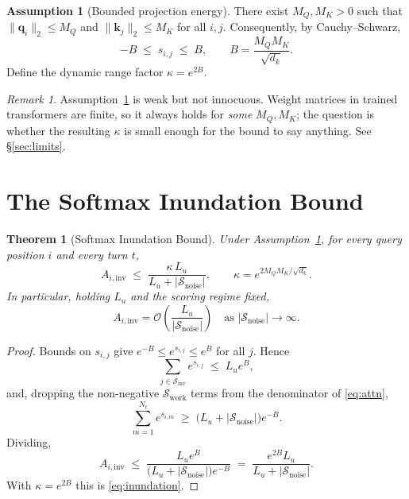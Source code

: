 ﻿\documentclass[11pt,a4paper]{article}
\theoremstyle{plain}
\newtheorem{theorem}{Theorem}
\theoremstyle{definition}
\newtheorem{assumption}{Assumption}
\theoremstyle{remark}
\newtheorem{remark}{Remark}
\begin{document}
\begin{assumption}[Bounded projection energy]
\label{assump:bounded}
There exist $M_Q, M_K > 0$ such that $\|\mathbf{q}_i\|_2 \le M_Q$ and
$\|\mathbf{k}_j\|_2 \le M_K$ for all $i,j$. Consequently, by Cauchy--Schwarz,
\begin{equation}
  -B \;\le\; s_{i,j} \;\le\; B,
  \qquad B = \frac{M_Q M_K}{\sqrt{d_k}} .
\end{equation}
Define the dynamic range factor $\kappa = e^{2B}$.
\end{assumption}

\begin{remark}
Assumption~\ref{assump:bounded} is weak but not innocuous. Weight matrices in
trained transformers are finite, so it always holds for \emph{some} $M_Q, M_K$;
the question is whether the resulting $\kappa$ is small enough for the bound to
say anything. See \S\ref{sec:limits}.
\end{remark}

\section{The Softmax Inundation Bound}
\label{sec:inundation}

\begin{theorem}[Softmax Inundation Bound]
\label{thm:inundation}
Under Assumption~\ref{assump:bounded}, for every query position $i$ and every
turn $t$,
\begin{equation}
  A_{i,\mathrm{inv}}
  \;\le\;
  \frac{\kappa\, L_u}{L_u + |\mathcal{S}_{\mathrm{noise}}|},
  \qquad \kappa = e^{2M_QM_K/\sqrt{d_k}} .
  \label{eq:inundation}
\end{equation}
In particular, holding $L_u$ and the scoring regime fixed,
\begin{equation}
  A_{i,\mathrm{inv}} = \mathcal{O}\!\left(\frac{L_u}{|\mathcal{S}_{\mathrm{noise}}|}\right)
  \quad \text{as } |\mathcal{S}_{\mathrm{noise}}| \to \infty .
\end{equation}
\end{theorem}

\begin{proof}
Bounds on $s_{i,j}$ give $e^{-B} \le e^{s_{i,j}} \le e^{B}$ for all $j$. Hence
\begin{equation}
  \sum_{j \in \mathcal{S}_{\mathrm{inv}}} e^{s_{i,j}} \;\le\; L_u e^{B},
\end{equation}
and, dropping the non-negative $\mathcal{S}_{\mathrm{work}}$ terms from the
denominator of \eqref{eq:attn},
\begin{equation}
  \sum_{m=1}^{N_t} e^{s_{i,m}}
  \;\ge\; \bigl(L_u + |\mathcal{S}_{\mathrm{noise}}|\bigr) e^{-B}.
\end{equation}
Dividing,
\begin{equation}
  A_{i,\mathrm{inv}}
  \;\le\;
  \frac{L_u e^{B}}{\bigl(L_u + |\mathcal{S}_{\mathrm{noise}}|\bigr) e^{-B}}
  \;=\;
  \frac{e^{2B} L_u}{L_u + |\mathcal{S}_{\mathrm{noise}}|}.
\end{equation}
With $\kappa = e^{2B}$ this is \eqref{eq:inundation}.
\end{proof}
\end{document}
